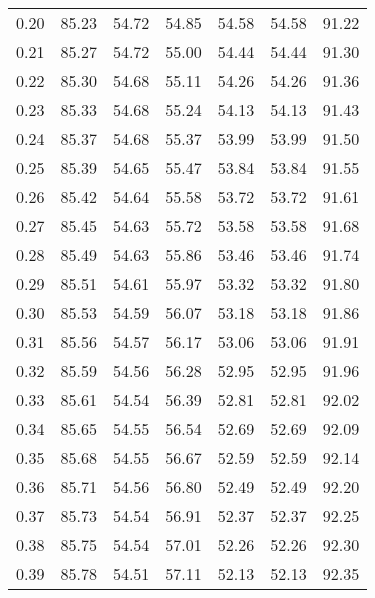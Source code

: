 \begin{tabular}{|c|c|c|c|c|c|c|}
      0.20 &     85.23 &     54.72 &      54.85 &   54.58 &      54.58 &         91.22 \\
      0.21 &     85.27 &     54.72 &      55.00 &   54.44 &      54.44 &         91.30 \\
      0.22 &     85.30 &     54.68 &      55.11 &   54.26 &      54.26 &         91.36 \\
      0.23 &     85.33 &     54.68 &      55.24 &   54.13 &      54.13 &         91.43 \\
      0.24 &     85.37 &     54.68 &      55.37 &   53.99 &      53.99 &         91.50 \\
      0.25 &     85.39 &     54.65 &      55.47 &   53.84 &      53.84 &         91.55 \\
      0.26 &     85.42 &     54.64 &      55.58 &   53.72 &      53.72 &         91.61 \\
      0.27 &     85.45 &     54.63 &      55.72 &   53.58 &      53.58 &         91.68 \\
      0.28 &     85.49 &     54.63 &      55.86 &   53.46 &      53.46 &         91.74 \\
      0.29 &     85.51 &     54.61 &      55.97 &   53.32 &      53.32 &         91.80 \\
      0.30 &     85.53 &     54.59 &      56.07 &   53.18 &      53.18 &         91.86 \\
      0.31 &     85.56 &     54.57 &      56.17 &   53.06 &      53.06 &         91.91 \\
      0.32 &     85.59 &     54.56 &      56.28 &   52.95 &      52.95 &         91.96 \\
      0.33 &     85.61 &     54.54 &      56.39 &   52.81 &      52.81 &         92.02 \\
      0.34 &     85.65 &     54.55 &      56.54 &   52.69 &      52.69 &         92.09 \\
      0.35 &     85.68 &     54.55 &      56.67 &   52.59 &      52.59 &         92.14 \\
      0.36 &     85.71 &     54.56 &      56.80 &   52.49 &      52.49 &         92.20 \\
      0.37 &     85.73 &     54.54 &      56.91 &   52.37 &      52.37 &         92.25 \\
      0.38 &     85.75 &     54.54 &      57.01 &   52.26 &      52.26 &         92.30 \\
      0.39 &     85.78 &     54.51 &      57.11 &   52.13 &      52.13 &         92.35 \\

\end{tabular}
